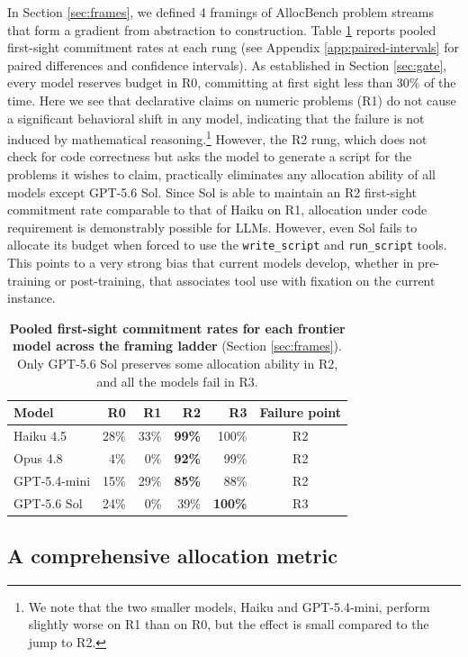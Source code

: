 \documentclass{article}
\begin{document}
In Section \ref{sec:frames}, we defined 4 framings of AllocBench problem streams that form a gradient from abstraction to construction. Table \ref{tab:ladder} reports pooled
first-sight commitment rates at each rung (see Appendix \ref{app:paired-intervals} for paired differences and confidence intervals). As established in Section \ref{sec:gate}, every model reserves budget in R0, committing at first sight less than $30\%$ of the time. Here we see that declarative claims on numeric problems (R1) do not cause a significant behavioral shift in any model, indicating that the failure is not induced by mathematical reasoning.\footnote{We note that the two smaller models, Haiku and GPT-5.4-mini, perform slightly worse on R1 than on R0, but the effect is small compared to the jump to R2.} However, the R2 rung, which does not check for code correctness but asks the model to generate a script for the problems it wishes to claim, practically eliminates any allocation ability of all models except GPT-5.6 Sol. Since Sol is able to maintain an R2 first-sight commitment rate comparable to that of Haiku on R1, allocation under code requirement is demonstrably possible for LLMs. However, even Sol fails to allocate its budget when forced to use the \texttt{write\_script} and \texttt{run\_script} tools. This points to a very strong bias that current models develop, whether in pre-training or post-training, that associates tool use with fixation on the current instance. 

\begin{table}
\centering
\small
\begin{tabular}{@{}|l|rrrr|c|@{}}
\hline
Model & R0 & R1 & R2 & R3 & Failure point \\
\hline
Haiku 4.5    & 28\%   & 33\% & \textbf{99\%}  & 100\%  & R2 \\
Opus 4.8     & 4\%    & 0\%  & \textbf{92\%} & 99\% & R2 \\
GPT-5.4-mini & 15\% & 29\% & \textbf{85\%} & 88\% & R2 \\
GPT-5.6 Sol  & 24\% & 0\%  & 39\% & \textbf{100\%}  & R3 \\
\hline
\end{tabular}
\caption{\textbf{Pooled first-sight commitment rates for each frontier model across the framing ladder} (Section \ref{sec:frames}). Only GPT-5.6 Sol preserves some allocation ability in R2, and all the models fail in R3.}
\label{tab:ladder}
\end{table}

\subsection{A comprehensive allocation metric}
\label{sec:score-results}
\end{document}
